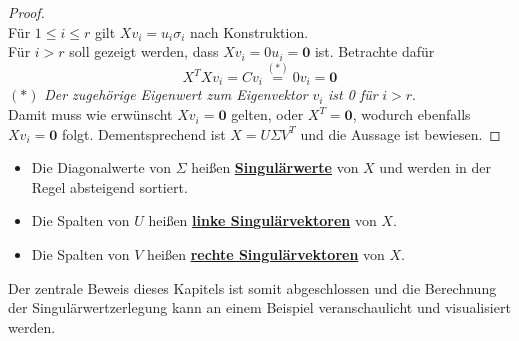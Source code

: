 \begin{proof}
\begin{equation*}
    \end{equation*}
    Für \(1 \leq i \leq r\) gilt \(Xv_i = u_i \sigma_i\) nach Konstruktion. \\
    Für \(i > r\) soll gezeigt werden, dass \(Xv_i = 0u_i  = \symbf{0}\) ist. 
    Betrachte dafür
    \begin{equation*}
        X^{T}Xv_i = Cv_i \overset{(*)}{=} 0v_i = \symbf{0}
    \end{equation*}
    {\small\((*)\) \textit{Der zugehörige Eigenwert zum Eigenvektor} \(v_i\) \textit{ist \num{0} für} \(i>r\).} 
    \vspace{5pt}
    \\
    Damit muss wie erwünscht \(Xv_i = \symbf{0}\) gelten, oder \(X^{T} = \symbf{0}\), wodurch ebenfalls \(Xv_i = \symbf{0}\) folgt.       
    Dementsprechend ist \(X = U \Sigma V^{T}\) und die Aussage ist bewiesen. 
\end{proof}
\begin{remark}\leavevmode
    \vspace{-14pt}
    \begin{itemize}
        \item Die Diagonalwerte von \(\Sigma\) heißen \textbf{\underline{Singulärwerte}} von \(X\) und werden in der Regel absteigend sortiert. 
        \item Die Spalten von \(U\) heißen \textbf{\underline{linke Singulärvektoren}} von \(X\).
        \item Die Spalten von \(V\) heißen \textbf{\underline{rechte Singulärvektoren}} von \(X\). 
    \end{itemize}       
\end{remark}
\enlargethispage{\baselineskip}%
Der zentrale Beweis dieses Kapitels ist somit abgeschlossen und die Berechnung der Singulärwertzerlegung kann an einem Beispiel veranschaulicht und visualisiert werden.
